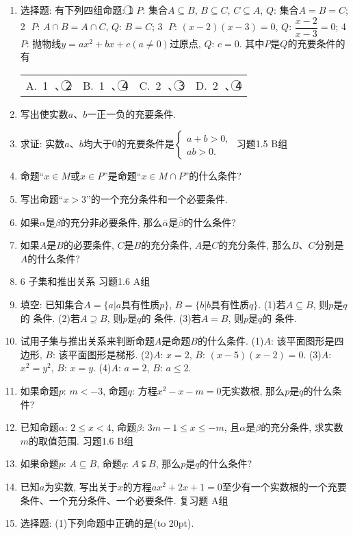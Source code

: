 \documentclass[10pt,a4paper]{article}
\newcommand{\bracket}[1]{(\hbox to #1pt{})}
\newcommand{\fourch}[4]{\par\begin{tabular}{p{.23\textwidth}p{.23\textwidth}p{.23\textwidth}p{.23\textwidth}}
A.~#1 &B.~#2& C.~#3& D.~#4
\end{tabular}}
\begin{document}
\begin{enumerate}[1.]
\item 选择题:
有下列四组命题:
\textcircled{1} $P$: 集合$A\subseteq B$, $B\subseteq C$, $C\subseteq A$, 		$Q$: 集合$A=B=C$;
\textcircled{2} $P$: $A\cap B=A\cap C$, 					$Q$: $B=C$;
\textcircled{3} $P$: $(x-2)(x-3)=0$, 				$Q$: $\dfrac{x-2}{x-3}=0$;
\textcircled{4} $P$: 抛物线$y=ax^2+bx+c(a\ne 0)$过原点, $Q$: $c=0$.
其中$P$是$Q$的充要条件的有
\fourch{\textcircled{1} 、\textcircled{2} }{\textcircled{1} 、\textcircled{4} }{\textcircled{2} 、\textcircled{3} }{\textcircled{2} 、\textcircled{4} }
\item 写出使实数$a$、$b$一正一负的充要条件.
\item 求证: 实数$a$、$b$均大于0的充要条件是$\begin{cases} a+b>0, \\ ab>0. \end{cases}$
习题1.5  B组
\item 命题``$x\in M$或$x\in P$''是命题``$x\in M\cap P$''的什么条件?
\item 写出命题``$x>3$''的一个充分条件和一个必要条件.
\item 如果$\alpha$是$\beta$的充分非必要条件, 那么$\overline{\alpha }$是$\overline{\beta }$的什么条件?
\item 如果$A$是$B$的必要条件, $C$是$B$的充分条件, $A$是$C$的充分条件, 那么$B$、$C$分别是$A$的什么条件?
\item 6  子集和推出关系
习题1.6  A组
\item 填空:
已知集合$A=\{a|a$具有性质$p\}$, $B=\{b|b$具有性质$q\}$.
(1)若$A\subseteq B$, 则$p$是$q$的  条件.
(2)若$A\supseteq B$, 则$p$是$q$的  条件.
(3)若$A=B$, 则$p$是$q$的  条件.
\item 试用子集与推出关系来判断命题$A$是命题$B$的什么条件.
(1)$A$: 该平面图形是四边形, 		$B$: 该平面图形是梯形.
(2)$A$: $x=2$, 					$B$: $(x-5)(x-2)=0$.
(3)$A$: $x^2=y^2$, 					$B$: $x=y$.
(4)$A$: $a=2$, 					$B$: $a\le 2$.
\item 如果命题$p$: $m<-3$, 命题$q$: 方程$x^2-x-m=0$无实数根, 那么$p$是$q$的什么条件?
\item 已知命题$\alpha$: $2\le x<4$, 命题$\beta$: $3m-1\le x\le -m$, 且$\alpha$是$\beta$的充分条件, 求实数$m$的取值范围.
习题1.6  B组
\item 如果命题$p$: $A\subseteq B$, 命题$q$: $A\subsetneqq B$, 那么$p$是$q$的什么条件?
\item 已知$a$为实数, 写出关于$x$的方程$ax^2+2x+1=0$至少有一个实数根的一个充要条件、一个充分条件、一个必要条件.
复习题
A组
\item 选择题:
(1)下列命题中正确的是\bracket{20}.

\end{enumerate}
\end{document}
